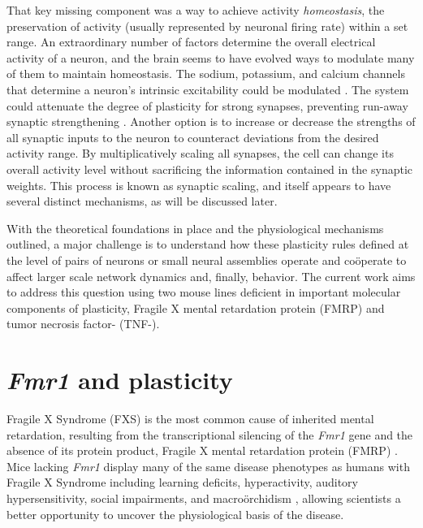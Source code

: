 That key missing component was a way to achieve activity \textit{homeostasis}, the preservation of activity (usually represented by neuronal firing rate) within a set range. An extraordinary number of factors determine the overall electrical activity of a neuron, and the brain seems to have evolved ways to modulate many of them to maintain homeostasis. The sodium, potassium, and calcium channels that determine a neuron's intrinsic excitability could be modulated \cite{Franklin1992}. The system could attenuate the degree of plasticity for strong synapses, preventing run-away synaptic strengthening \cite{VanRossum2000}. Another option is to increase or decrease the strengths of all synaptic inputs to the neuron to counteract deviations from the desired activity range. By multiplicatively scaling all synapses, the cell can change its overall activity level without sacrificing the information contained in the synaptic weights. This process is known as synaptic scaling, and itself appears to have several distinct mechanisms, as will be discussed later.

With the theoretical foundations in place and the physiological mechanisms outlined, a major challenge is to understand how these plasticity rules defined at the level of pairs of neurons or small neural assemblies operate and co\"operate to affect larger scale network dynamics and, finally, behavior. The current work aims to address this question using two mouse lines deficient in important molecular components of plasticity, Fragile X mental retardation protein (FMRP) and tumor necrosis factor-\textalpha{} (TNF-\textalpha{}).

\section{\textit{Fmr1} and plasticity}

Fragile X Syndrome (FXS) is the most common cause of inherited mental retardation, resulting from the transcriptional silencing of the \textit{Fmr1} gene and the absence of its protein product, Fragile X mental retardation protein (FMRP) \cite{Bailey1998, Jin2003}. Mice lacking \textit{Fmr1} display many of the same disease phenotypes as humans with Fragile X Syndrome including learning deficits, hyperactivity, auditory hypersensitivity, social impairments, and macro\"orchidism \cite{DutchBelgianFragileXConsortium1994, Bernardet2006, Moy2008}, allowing scientists a better opportunity to uncover the physiological basis of the disease.

